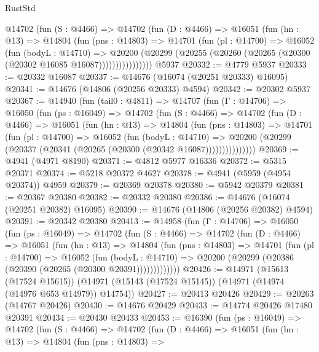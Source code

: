 \begin{lexlean}{RustStd}
\begin{coremodule}
          @14702
            (fun (S : @4466) =>
            @14702
              (fun (D : @4466) =>
              @16051
                (fun (hn : @13) =>
                @14804
                  (fun (pns : @14803) =>
                  @14701
                    (fun (pl : @14700) =>
                    @16052
                      (fun (bodyL : @14710) =>
                      @20200
                        (@20299
                          (@20255 (@20260 (@20265 (@20300 (@20302 @16085 @16087))))))))))))))))
    @5937
@20332 := @4779 @5937
@20333 := @20332 @16087
@20337 := @14676 (@16074 (@20251 @20333) @16095)
@20341 := @14676 (@14806 (@20256 @20333) @4594)
@20342 := @20302 @5937
@20367 := @14940
    (fun (tail0 : @4811) =>
    @14707
      (fun (Γ : @14706) =>
      @16050
        (fun (ps : @16049) =>
        @14702
          (fun (S : @4466) =>
          @14702
            (fun (D : @4466) =>
            @16051
              (fun (hn : @13) =>
              @14804
                (fun (pns : @14803) =>
                @14701
                  (fun (pl : @14700) =>
                  @16052
                    (fun (bodyL : @14710) =>
                    @20200 (@20299 (@20337 (@20341 (@20265 (@20300 (@20342 @16087)))))))))))))))
@20369 := @4941 (@4971 @8190)
@20371 := @4812 @5977 @16336
@20372 := @5315 @20371
@20374 := @5218 @20372 @4627
@20378 := @4941 (@5959 (@4954 @20374)) @4959
@20379 := @20369 @20378
@20380 := @5942 @20379
@20381 := @20367 @20380
@20382 := @20332 @20380
@20386 := @14676 (@16074 (@20251 @20382) @16095)
@20390 := @14676 (@14806 (@20256 @20382) @4594)
@20391 := @20342 @20380
@20413 := @14958
    (fun (Γ : @14706) =>
    @16050
      (fun (ps : @16049) =>
      @14702
        (fun (S : @4466) =>
        @14702
          (fun (D : @4466) =>
          @16051
            (fun (hn : @13) =>
            @14804
              (fun (pns : @14803) =>
              @14701
                (fun (pl : @14700) =>
                @16052
                  (fun (bodyL : @14710) =>
                  @20200 (@20299 (@20386 (@20390 (@20265 (@20300 @20391)))))))))))))
@20426 := @14971
    (@15613 (@17524 @15615))
    (@14971 (@15143 (@17524 @15145)) (@14971 (@14974 (@14976 @653 @14979)) @14754))
@20427 := @20413 @20426
@20429 := @20263 (@14767 @20426)
@20430 := @14676 @20429
@20433 := @14774 @20426 @17480 @20391
@20434 := @20430 @20433
@20453 := @16390
    (fun (ps : @16049) =>
    @14702
      (fun (S : @4466) =>
      @14702
        (fun (D : @4466) =>
        @16051
          (fun (hn : @13) =>
          @14804
            (fun (pns : @14803) =>

\end{coremodule}
\end{lexlean}

